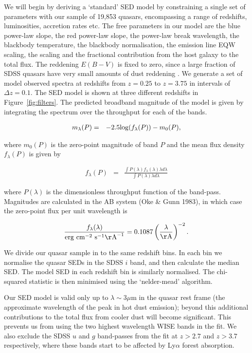 We will begin by deriving a `standard' \ac{SED} model by constraining a single set of parameters with our sample of 19,853 quasars, encompassing a range of redshifts, luminosities, accretion rates etc. 
The free parameters in our model are the blue power-law slope, the red power-law slope, the power-law break wavelength, the blackbody temperature, the blackbody normalisation, the emission line \ac{EQW} scaling, the \ha scaling and the fractional contribution from the host galaxy to the total flux. 
The reddening $E(B-V)$ is fixed to zero, since a large fraction of \ac{SDSS} quasars have very small amounts of dust reddening \citep{richards03}. 
We generate a set of model observed spectra at redshifts from $z=0.25$ to $z=3.75$ in intervals of $\Delta z = 0.1$. 
The \ac{SED} model is shown at three different redshifts in Figure~\ref{fig:filters}. 
The predicted broadband magnitude of the model is given by integrating the spectrum over the throughput for each of the bands.  

\begin{eqnarray}
  m_\lambda(P) & = & -2.5{\rm log}(f_\lambda(P)) - m_0(P), 
\end{eqnarray}

where $m_0(P)$ is the zero-point magnitude of band $P$ and the mean flux density $f_{\lambda}(P)$ is given by 

\begin{eqnarray}
  \label{eq:flux}
  f_{\lambda}(P) & = & \frac{\int P(\lambda) f_\lambda(\lambda) \lambda d\lambda }{\int P(\lambda) \lambda d\lambda}
\end{eqnarray}

where $P(\lambda)$ is the dimensionless throughput function of the band-pass. 
Magnitudes are calculated in the AB system (Oke \& Gunn 1983), in which case the zero-point flux per unit wavelength is 

\begin{eqnarray}
  \frac{f_\lambda(\lambda)}{{\rm erg}~{\rm cm}^{-2}~{\rm s}^{-1} {\rm\AA}^{-1}} = 0.1087 \left(\frac{\lambda}{\rm \AA}\right)^{-2}.
\end{eqnarray}


We divide our quasar sample in to the same redshift bins.
In each bin we normalise the quasar \ac{SED}s in the SDSS $i$ band, and then calculate the median \ac{SED}. 
The model \ac{SED} in each redshift bin is similarly normalised. 
The chi-squared statistic is then minimised using the `nelder-mead' algorithm. 

Our \ac{SED} model is valid only up to $\lambda \sim 3\mu$m in the quasar rest frame (the approximate wavelength of the peak in hot dust emission); beyond this additional contributions to the total flux from cooler dust will become significant. 
This prevents us from using the two highest wavelength WISE bands in the fit. 
We also exclude the SDSS $u$ and $g$ band-passes from the fit at $z > 2.7$ and $z > 3.7$ respectively, where these bands start to be affected by Ly$\alpha$ forest absorption.

